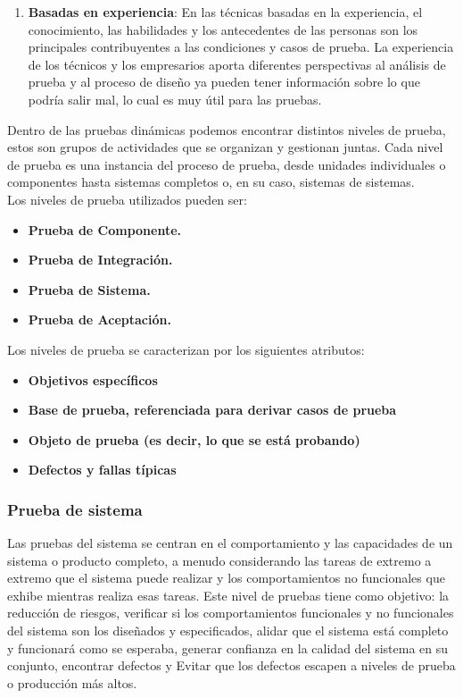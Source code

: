 \begin{enumerate}
	\item \textbf {Basadas en experiencia}: En las técnicas basadas en la experiencia, el conocimiento, las habilidades y los antecedentes de las personas son los principales contribuyentes a las condiciones y casos de prueba. La experiencia de los técnicos y los empresarios aporta diferentes perspectivas al análisis de prueba y al proceso de diseño ya pueden tener información sobre lo que podría salir mal, lo cual es muy útil para las pruebas.

\end{enumerate}

Dentro de las pruebas dinámicas podemos encontrar distintos niveles de prueba, estos son grupos de actividades que se organizan y gestionan juntas. Cada nivel de prueba es una instancia del proceso de prueba, desde unidades individuales o componentes hasta sistemas completos o, en su caso, sistemas de sistemas.\\

Los niveles de prueba utilizados pueden ser:

\begin{itemize}
	\item \textbf {Prueba de Componente.}
	\item \textbf {Prueba de Integración.}
	\item \textbf {Prueba de Sistema.}
	\item \textbf {Prueba de Aceptación.}
\end{itemize}

Los niveles de prueba se caracterizan por los siguientes atributos:

\begin{itemize}
	\item \textbf {Objetivos específicos}
	\item \textbf {Base de prueba, referenciada para derivar casos de prueba}
	\item \textbf {Objeto de prueba (es decir, lo que se está probando)}
	\item \textbf {Defectos y fallas típicas}
\end{itemize}

\subsubsection{Prueba de sistema}

Las pruebas del sistema se centran en el comportamiento y las capacidades de un sistema o producto completo, a menudo considerando las tareas de extremo a extremo que el sistema puede realizar y los comportamientos no funcionales que exhibe mientras realiza esas tareas. Este nivel de pruebas tiene como objetivo: la reducción de riesgos, verificar si los comportamientos funcionales y no funcionales del sistema son los diseñados y especificados, alidar que el sistema está completo y funcionará como se esperaba, generar confianza en la calidad del sistema en su conjunto, encontrar defectos y Evitar que los defectos escapen a niveles de prueba o producción más altos.

